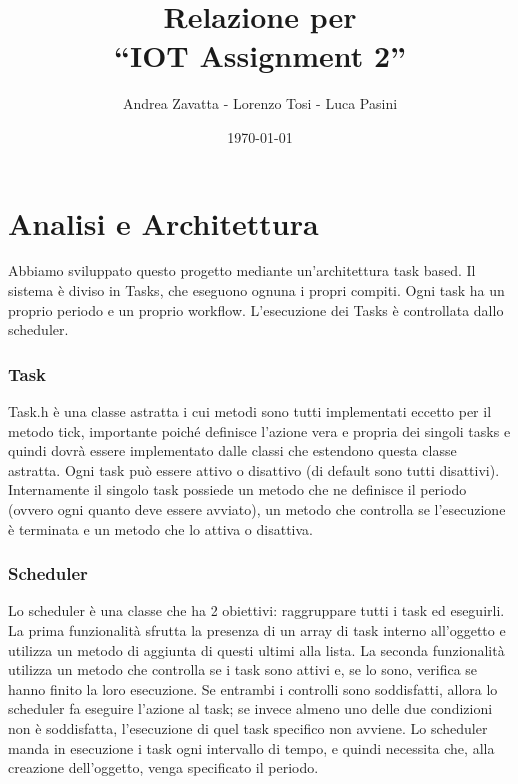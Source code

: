 \documentclass[a4paper,12pt]{report}
\title{Relazione per\\``IOT Assignment 2''}
\author{Andrea Zavatta - Lorenzo Tosi - Luca Pasini}
\date{\today}
\begin{document}
\maketitle

\tableofcontents

\newpage
\chapter{Analisi e Architettura}
\par
Abbiamo sviluppato questo progetto mediante un'architettura task based. Il sistema è diviso in Tasks, che eseguono ognuna i propri compiti. Ogni task ha un proprio periodo e un proprio workflow. L'esecuzione dei Tasks è controllata dallo scheduler.

\subsection{Task}
\par
Task.h è una classe astratta i cui metodi sono tutti implementati eccetto per il metodo tick, importante poiché definisce l'azione vera e propria dei singoli tasks e quindi dovrà essere implementato dalle classi che estendono questa classe astratta.
Ogni task può essere attivo o disattivo (di default sono tutti disattivi). Internamente il singolo task possiede un metodo che ne definisce il periodo (ovvero ogni quanto deve essere avviato), un metodo che controlla se l'esecuzione è terminata e un metodo che lo attiva o disattiva.

\subsection{Scheduler}
\par
Lo scheduler è una classe che ha 2 obiettivi: raggruppare tutti i task ed eseguirli. La prima funzionalità sfrutta la presenza di un array di task interno all'oggetto e utilizza un metodo di aggiunta di questi ultimi alla lista. La seconda funzionalità utilizza un metodo che controlla se i task sono attivi e, se lo sono, verifica se hanno finito la loro esecuzione. Se entrambi i controlli sono soddisfatti, allora lo scheduler fa eseguire l'azione al task; se invece almeno uno delle due condizioni non è soddisfatta, l'esecuzione di quel task specifico non avviene. Lo scheduler manda in esecuzione i task ogni intervallo di tempo, e quindi necessita che, alla creazione dell'oggetto, venga specificato il periodo.
\end{document}
